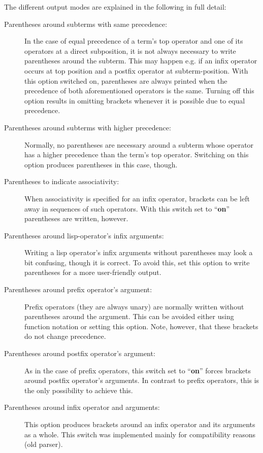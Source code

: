 The different output modes are explained in the following in full detail:
\begin{description}
\item[Parentheses around subterms with same precedence:]
  In the case of equal precedence of a term's top operator and one
  of its operators at a direct subposition, it is not always necessary
  to write parentheses around the subterm. 
  This may happen e.g. if an infix operator occurs at top
  position and a postfix operator at subterm-position.
  With this option switched on, parentheses are always printed when
  the precedence of both aforementioned operators is the same.
  Turning off this option results in omitting brackets whenever it is possible
  due to equal precedence.
\item[Parentheses around subterms with higher precedence:]
  Normally, no parentheses are necessary around a subterm whose operator
  has a higher precedence than the term's top operator. Switching on this
  option produces parentheses in this case, though.
\item[Parentheses to indicate associativity:] When associativity is specified
  for an infix operator, brackets can be left away in sequences of such
  operators. 
  With this switch set to ``{\bf on}'' parentheses are written, however.
\item[Parentheses around lisp-operator's infix arguments:] Writing a lisp
  operator's infix arguments without parentheses may look a bit confusing, 
  though  it is correct. 
  To avoid this, set this option to write parentheses for a more
  user-friendly output.
\item[Parentheses around prefix operator's argument:] Prefix operators (they
  are always unary) are normally written without parentheses around the 
  argument.
  This can be avoided either using function notation or setting this option.
  Note, however, that these brackets do not change precedence.
\item[Parentheses around postfix operator's argument:] As in the case of prefix
  operators, this switch set to ``{\bf on}'' forces brackets around postfix 
  operator's
  arguments. In contrast to prefix operators, this is the only possibility to
  achieve this.
\item[Parentheses around infix operator and arguments:] This option produces
  brackets around an infix operator and its arguments as a whole. This switch
  was implemented mainly for compatibility reasons (old parser).

\end{description}
